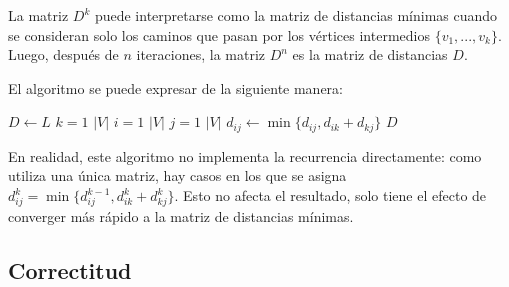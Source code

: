 La matriz $D^k$ puede interpretarse como la matriz de distancias mínimas cuando se consideran solo los caminos que pasan por los vértices intermedios $\{v_1, ..., v_k\}$. Luego, después de $n$ iteraciones, la matriz $D^n$ es la matriz de distancias $D$.

El algoritmo se puede expresar de la siguiente manera:

\begin{codebox}
    \li $D \gets L$
    \li \For $k = 1$ \To $|V|$ \Do
    \li \For $i = 1$ \To $|V|$ \Do
    \li \For $j = 1$ \To $|V|$ \Do
    \li $d_{ij} \gets \min{\{d_{ij}, d_{ik} + d_{kj}\}}$
    \End
    \End
    \End
    \li \Return $D$
\end{codebox}

En realidad, este algoritmo no implementa la recurrencia directamente: como utiliza una única matriz, hay casos en los que se asigna $d^k_{ij} = \min{\{d^{k - 1}_{ij}, d^k_{ik} + d^k_{kj}\}}$. Esto no afecta el resultado, solo tiene el efecto de converger más rápido a la matriz de distancias mínimas.

\subsection{Correctitud}

